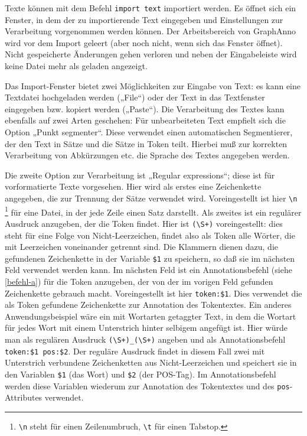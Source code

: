 \documentclass[12pt]{scrartcl}
\begin{document}
Texte können mit dem Befehl \texttt{import text} importiert werden. Es öffnet sich ein Fenster, in dem der zu importierende Text eingegeben und Einstellungen zur Verarbeitung vorgenommen werden können.
Der Arbeitsbereich von GraphAnno wird vor dem Import geleert (aber noch nicht, wenn sich das Fenster öffnet). Nicht gespeicherte Änderungen gehen verloren und neben der Eingabeleiste wird keine Datei mehr als geladen angezeigt.

Das Import-Fenster bietet zwei Möglichkeiten zur Eingabe von Text: es kann eine Textdatei hochgeladen werden („File“) oder der Text in das Textfenster eingegeben bzw. kopiert werden („Paste“). Die Verarbeitung des Textes kann ebenfalls auf zwei Arten geschehen: Für unbearbeiteten Text empfielt sich die Option „Punkt segmenter“. Diese verwendet einen automatischen Segmentierer, der den Text in Sätze und die Sätze in Token teilt. Hierbei muß zur korrekten Verarbeitung von Abkürzungen etc. die Sprache des Textes angegeben werden.

Die zweite Option zur Verarbeitung ist „Regular expressions“; diese ist für vorformatierte Texte vorgesehen. Hier wird als erstes eine Zeichenkette angegeben, die zur Trennung der Sätze verwendet wird. Voreingestellt ist hier \texttt{{\textbackslash}n} \footnote{\texttt{{\textbackslash}n} steht für einen Zeilenumbruch, \texttt{{\textbackslash}t} für einen Tabstop.} für eine Datei, in der jede Zeile einen Satz darstellt. Als zweites ist ein regulärer Ausdruck anzugeben, der die Token findet. Hier ist \texttt{({\textbackslash}S+)} voreingestellt: dies steht für eine Folge von Nicht-Leerzeichen, findet also als Token alle Wörter, die mit Leerzeichen voneinander getrennt sind. Die Klammern dienen dazu, die gefundenen Zeichenkette in der Variable \texttt{\$1} zu speichern, so daß sie im nächsten Feld verwendet werden kann. Im nächsten Feld ist ein Annotationsbefehl (siehe \ref{befehl-a}) für die Token anzugeben, der von der im vorigen Feld gefunden Zeichenkette gebrauch macht. Voreingestellt ist hier \texttt{token:\$1}. Dies verwendet die als Token gefundene Zeichenkette zur Annotation des Tokentextes. Ein anderes Anwendungsbeispiel wäre ein mit Wortarten getaggter Text, in dem die Wortart für jedes Wort mit einem Unterstrich hinter selbigem angefügt ist. Hier würde man als regulären Ausdruck \texttt{({\textbackslash}S+)\_({\textbackslash}S+)} angeben und als Annotationsbefehl \texttt{token:\$1 pos:\$2}. Der reguläre Ausdruck findet in diesem Fall zwei mit Unterstrich verbundene Zeichenketten aus Nicht-Leerzeichen und speichert sie in den Variablen \texttt{\$1} (das Wort) und \texttt{\$2} (der POS-Tag). Im Annotationsbefehl werden diese Variablen wiederum zur Annotation des Tokentextes und des \texttt{pos}-Attributes verwendet.
\end{document}
